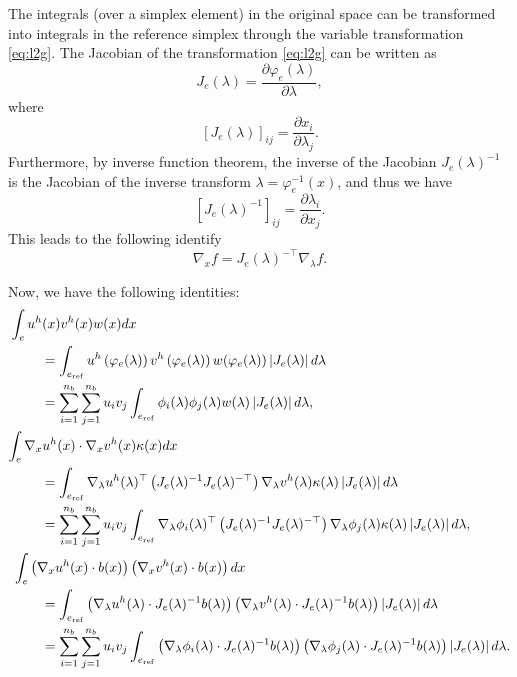 \documentclass[a4paper,11pt]{scrartcl}
\newcommand{\eq}[1]{\begin{equation} #1 \end{equation}}
\newcommand{\eqs}[1]{\begin{align} #1 \end{align}}
\begin{document}
The integrals (over a simplex element) in the original space can be transformed into integrals in the reference simplex through the variable transformation \eqref{eq:l2g}.
%
The Jacobian of the transformation \eqref{eq:l2g} can be written as
\eq{J_e(\lambda) = \frac{\partial \varphi_e(\lambda)}{\partial \lambda},}
where
\eq{\left[J_e(\lambda)\right]_{ij} = \frac{\partial x_i}{\partial \lambda_j}.}
%
Furthermore, by inverse function theorem, the inverse of the Jacobian $J_e(\lambda)^{-1}$ is the Jacobian of the inverse transform $\lambda = \varphi_e^{-1}(x)$, and thus we have
\eq{\left[J_e(\lambda)^{-1}\right]_{ij} = \frac{\partial \lambda_i}{\partial x_j}.}
%
This leads to the following identify
\eq{
\nabla_x f = J_e(\lambda)^{-\top} \nabla_\lambda f.
}

Now, we have the following identities:
\eqs{
%
\int_{e} u^h(x) v^h(x) w(x) dx \hspace{-7em}& \nonumber \\
& =  \int_{e_{\rm ref}} u^h\left(\varphi_e(\lambda)\right) v^h\left(\varphi_e(\lambda)\right) w(\varphi_e(\lambda)) \left|J_e(\lambda)\right| d\lambda \nonumber \\
%
& = \sum_{i=1}^{n_b} \sum_{j=1}^{n_b} u_i v_j \int_{e_{\rm ref}} \phi_i( \lambda ) \phi_j( \lambda ) w(\lambda) \left|J_e(\lambda)\right| d\lambda , \label{eq:mass1} \\
%
%
\int_{e} \nabla_x u^h(x) \cdot \nabla_x v^h(x) \kappa(x) dx \hspace{-10em} & \nonumber\\
& =
%
\int_{e_{\rm ref}} \nabla_\lambda u^h(\lambda) ^\top \left( J_e(\lambda)^{-1} J_e(\lambda)^{-\top} \right) \nabla_\lambda v^h(\lambda) \kappa(\lambda) \left|J_e(\lambda)\right| d\lambda \nonumber \\
%
& = \sum_{i=1}^{n_b} \sum_{j=1}^{n_b} u_i v_j \int_{e_{\rm ref}} \nabla_\lambda \phi_i( \lambda ) ^\top \left( J_e(\lambda)^{-1} J_e(\lambda)^{-\top} \right) \nabla_\lambda \phi_j( \lambda ) \kappa(\lambda) \left|J_e(\lambda)\right| d\lambda, \label{eq:stiff_scalar1} \\
%
%
%
\int_{e} \left( \nabla_x u^h(x) \cdot b(x) \right) \left( \nabla_x v^h(x) \cdot b(x) \right) dx \hspace{-15em} & \nonumber \\
& = \int_{e_{\rm ref}} \left( \nabla_\lambda u^h(\lambda) \cdot J_e(\lambda)^{-1} b(\lambda) \right) \left( \nabla_\lambda v^h(\lambda) \cdot J_e(\lambda)^{-1} b(\lambda) \right)  \left|J_e(\lambda)\right| d\lambda \nonumber \\
& = \sum_{i=1}^{n_b} \sum_{j=1}^{n_b} u_i v_j \int_{e_{\rm ref}} \left( \nabla_\lambda \phi_i( \lambda ) \cdot J_e(\lambda)^{-1} b(\lambda) \right) \left( \nabla_\lambda \phi_j( \lambda ) \cdot J_e(\lambda)^{-1} b(\lambda) \right)  \left|J_e(\lambda)\right| d\lambda. \label{eq:stiff_vec1}
}
\end{document}
